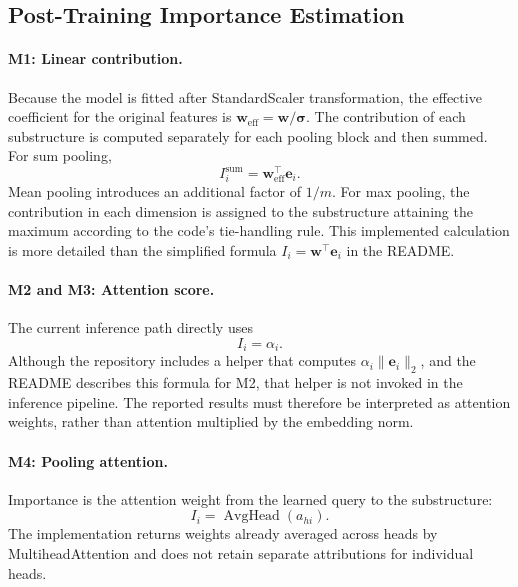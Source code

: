 \subsection{Post-Training Importance Estimation}

\paragraph{M1: Linear contribution.}
Because the model is fitted after StandardScaler transformation, the effective
coefficient for the original features is
\(\mathbf{w}_{\mathrm{eff}}=\mathbf{w}/\boldsymbol{\sigma}\). The contribution
of each substructure is computed separately for each pooling block and then
summed. For sum pooling,
\begin{equation}
    I_i^{\mathrm{sum}} =
    \mathbf{w}_{\mathrm{eff}}^\top\mathbf{e}_i.
\end{equation}
Mean pooling introduces an additional factor of \(1/m\). For max pooling, the
contribution in each dimension is assigned to the substructure attaining the
maximum according to the code's tie-handling rule. This implemented calculation
is more detailed than the simplified formula
\(I_i=\mathbf{w}^\top\mathbf{e}_i\) in the README.

\paragraph{M2 and M3: Attention score.}
The current inference path directly uses
\begin{equation}
    I_i=\alpha_i.
\end{equation}
Although the repository includes a helper that computes
\(\alpha_i\lVert\mathbf{e}_i\rVert_2\), and the README describes this formula
for M2, that helper is not invoked in the inference pipeline. The reported
results must therefore be interpreted as attention weights, rather than
attention multiplied by the embedding norm.

\paragraph{M4: Pooling attention.}
Importance is the attention weight from the learned query to the substructure:
\begin{equation}
    I_i=\operatorname{AvgHead}\left(a_{hi}\right).
\end{equation}
The implementation returns weights already averaged across heads by
MultiheadAttention and does not retain separate attributions for individual
heads.

